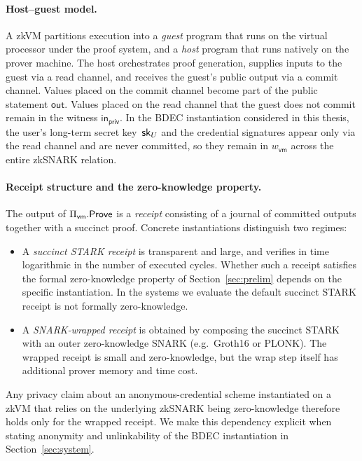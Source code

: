 \paragraph{Host--guest model.}
A zkVM partitions execution into a \emph{guest} program that runs on the virtual processor under the proof system, and a \emph{host} program that runs natively on the prover machine. The host orchestrates proof generation, supplies inputs to the guest via a read channel, and receives the guest's public output via a commit channel. Values placed on the commit channel become part of the public statement $\mathsf{out}$. Values placed on the read channel that the guest does not commit remain in the witness $\mathsf{in}_{\mathsf{priv}}$. In the BDEC instantiation considered in this thesis, the user's long-term secret key~$\mathsf{sk}_U$ and the credential signatures appear only via the read channel and are never committed, so they remain in $w_{\mathsf{vm}}$ across the entire zkSNARK relation.

\paragraph{Receipt structure and the zero-knowledge property.}
The output of $\Pi_{\mathsf{vm}}.\mathsf{Prove}$ is a \emph{receipt} consisting of a journal of committed outputs together with a succinct proof. Concrete instantiations distinguish two regimes:
\begin{itemize}
  \item A \emph{succinct STARK receipt} is transparent and large, and verifies in time logarithmic in the number of executed cycles. Whether such a receipt satisfies the formal zero-knowledge property of Section~\ref{sec:prelim} depends on the specific instantiation. In the systems we evaluate the default succinct STARK receipt is not formally zero-knowledge.
  \item A \emph{SNARK-wrapped receipt} is obtained by composing the succinct STARK with an outer zero-knowledge SNARK (e.g.\ Groth16 or PLONK). The wrapped receipt is small and zero-knowledge, but the wrap step itself has additional prover memory and time cost.
\end{itemize}
Any privacy claim about an anonymous-credential scheme instantiated on a zkVM that relies on the underlying zkSNARK being zero-knowledge therefore holds only for the wrapped receipt. We make this dependency explicit when stating anonymity and unlinkability of the BDEC instantiation in Section~\ref{sec:system}.


